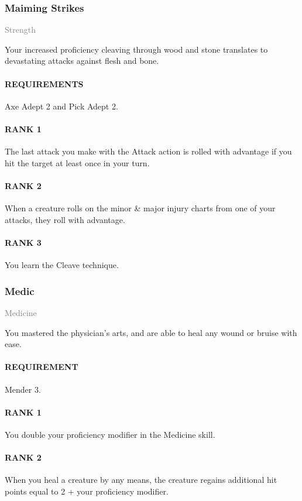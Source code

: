 \subsubsection{Maiming Strikes} \label{feat::maimingstrikes}
\small{\textcolor{gray}{Strength}}

\normalsize
Your increased proficiency cleaving through wood and stone translates to devastating attacks against flesh and bone.
\paragraph{REQUIREMENTS} Axe Adept 2 and Pick Adept 2.
\paragraph{RANK 1} The last attack you make with the Attack action is rolled with advantage if you hit the target at least once in your turn.
\paragraph{RANK 2} When a creature rolls on the minor \& major injury charts from one of your attacks, they roll with advantage.
\paragraph{RANK 3} You learn the Cleave technique.

\subsubsection{Medic} \label{feat::medic}
\small{\textcolor{gray}{Medicine}}

\normalsize
You mastered the physician's arts, and are able to heal any wound or bruise with ease.
\paragraph{REQUIREMENT} Mender 3.
\paragraph{RANK 1} You double your proficiency modifier in the Medicine skill.
\paragraph{RANK 2} When you heal a creature by any means, the creature regains additional hit points equal to 2 + your proficiency modifier.
